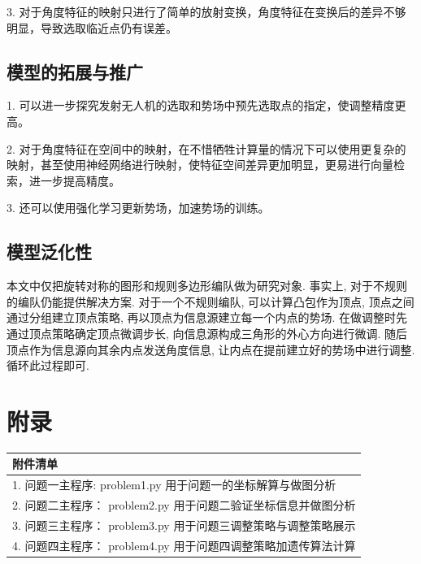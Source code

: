 \documentclass{my_paper}
\begin{document}
3. 对于角度特征的映射只进行了简单的放射变换，角度特征在变换后的差异不够明显，导致选取临近点仍有误差。


\subsection{模型的拓展与推广}
1. 可以进一步探究发射无人机的选取和势场中预先选取点的指定，使调整精度更高。

2. 对于角度特征在空间中的映射，在不惜牺牲计算量的情况下可以使用更复杂的映射，甚至使用神经网络进行映射，使特征空间差异更加明显，更易进行向量检索，进一步提高精度。

3. 还可以使用强化学习更新势场，加速势场的训练。

\subsection{模型泛化性}
本文中仅把旋转对称的图形和规则多边形编队做为研究对象. 事实上, 对于不规则的编队仍能提供解决方案. 对于一个不规则编队, 可以计算凸包作为顶点, 顶点之间通过分组建立顶点策略, 再以顶点为信息源建立每一个内点的势场. 在做调整时先通过顶点策略确定顶点微调步长, 向信息源构成三角形的外心方向进行微调. 随后顶点作为信息源向其余内点发送角度信息, 让内点在提前建立好的势场中进行调整. 循环此过程即可.

\begin{center}
\end{center}


\newpage
\newpage
\section{附录}

\begin{table}[htbp]
    \centering
    \begin{tabular}{|p{14.0cm}|}
    \hline
    \textbf{附件清单} \\ %
    \hline
    1. 问题一主程序: \quad problem1.py \quad 用于问题一的坐标解算与做图分析 \\ 
    2. 问题二主程序：  \quad problem2.py \quad  用于问题二验证坐标信息并做图分析\\
    3. 问题三主程序：  \quad problem3.py \quad 用于问题三调整策略与调整策略展示\\
    4. 问题四主程序：  \quad problem4.py \quad 用于问题四调整策略加遗传算法计算\\
    \hline
    \end{tabular}
\end{table}
\end{document}
